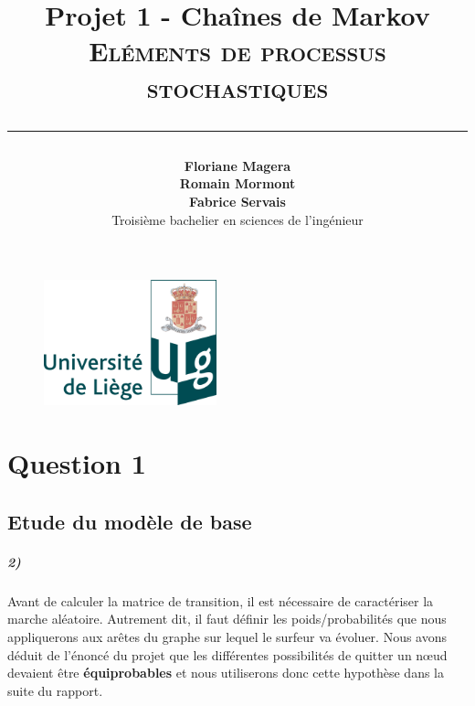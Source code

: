 \documentclass[a4paper,titlepage]{report}
\begin{document}
\begin{titlepage}

\begin{figure}
\centering
\includegraphics[width=5cm]{logo-ulg.png}
\end{figure}



\title{
\vspace{0.2cm}
\LARGE{\textbf{Projet 1 - Chaînes de Markov}} \\ \textsc{Eléments de processus stochastiques}
\author{\textbf{Floriane Magera} \\ \textbf{Romain Mormont} \\ \textbf{Fabrice Servais}\\ Troisième bachelier en sciences de l'ingénieur}
\date{}
\rule{15cm}{1.5pt}
}

\end{titlepage}

\pagestyle{fancy}

\maketitle
\newpage
\tableofcontents
\newpage
\chapter{Question 1}
\section{Etude du modèle de base}
\paragraph{2)} Avant de calculer la matrice de transition, il est nécessaire de caractériser la marche aléatoire. Autrement dit, il faut définir les poids/probabilités que nous appliquerons aux arêtes du graphe sur lequel le surfeur va évoluer. Nous avons déduit de l'énoncé du projet que les différentes possibilités de quitter un nœud devaient être \textbf{équiprobables} et nous utiliserons donc cette hypothèse dans la suite du rapport.
\end{document}
